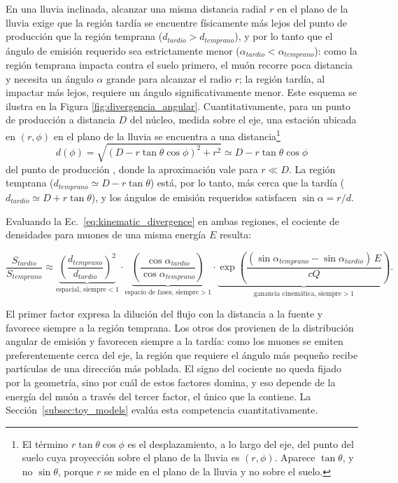 En una lluvia inclinada, alcanzar una misma distancia radial $r$ en el plano de la lluvia exige que la región tardía se encuentre físicamente más lejos del punto de producción que la región temprana ($d_{tardio} > d_{temprano}$), y por lo tanto que el ángulo de emisión requerido sea estrictamente menor ($\alpha_{tardio} < \alpha_{temprano}$): como la región temprana impacta contra el suelo primero, el muón recorre poca distancia y necesita un ángulo $\alpha$ grande para alcanzar el radio $r$; la región tardía, al impactar más lejos, requiere un ángulo significativamente menor. Este esquema se ilustra en la Figura \ref{fig:divergencia_angular}. Cuantitativamente, para un punto de producción a distancia $D$ del núcleo, medida sobre el eje, una estación ubicada en $(r,\phi)$ en el plano de la lluvia se encuentra a una distancia\footnote{El término $r\tan\theta\cos\phi$ es el desplazamiento, a lo largo del eje, del punto del suelo cuya proyección sobre el plano de la lluvia es $(r,\phi)$. Aparece $\tan\theta$, y no $\sin\theta$, porque $r$ se mide en el plano de la lluvia y no sobre el suelo.}
\begin{equation}
	d(\phi) = \sqrt{\left(D - r\tan\theta\cos\phi\right)^2 + r^2} \simeq D - r\tan\theta\cos\phi
	\label{eq:distancia_fuente}
\end{equation}
del punto de producción \cite{Armbruster2018}, donde la aproximación vale para $r \ll D$. La región temprana ($d_{temprano}\simeq D - r\tan\theta$) está, por lo tanto, más cerca que la tardía ($d_{tardio}\simeq D + r\tan\theta$), y los ángulos de emisión requeridos satisfacen $\sin\alpha = r/d$.

Evaluando la Ec.~\ref{eq:kinematic_divergence} en ambas regiones, el cociente de densidades para muones de una misma energía $E$ resulta:

\begin{equation}
	\frac{S_{tardio}}{S_{temprano}} \approx \underbrace{\left(\frac{d_{temprano}}{d_{tardio}}\right)^2}_{\text{espacial, siempre} < 1} \cdot \underbrace{\left(\frac{\cos\alpha_{tardio}}{\cos\alpha_{temprano}}\right)}_{\text{espacio de fases, siempre} > 1} \cdot \underbrace{\exp\left(\frac{(\sin\alpha_{temprano} - \sin\alpha_{tardio})\,E}{cQ}\right)}_{\text{ganancia cinemática, siempre} > 1}.
	\label{eq:asym_kinematic_ratio}
\end{equation}

El primer factor expresa la dilución del flujo con la distancia a la fuente y favorece siempre a la región temprana. Los otros dos provienen de la distribución angular de emisión y favorecen siempre a la tardía: como los muones se emiten preferentemente cerca del eje, la región que requiere el ángulo más pequeño recibe partículas de una dirección más poblada. El signo del cociente no queda fijado por la geometría, sino por cuál de estos factores domina, y eso depende de la energía del muón a través del tercer factor, el único que la contiene. La Sección~\ref{subsec:toy_models} evalúa esta competencia cuantitativamente.

